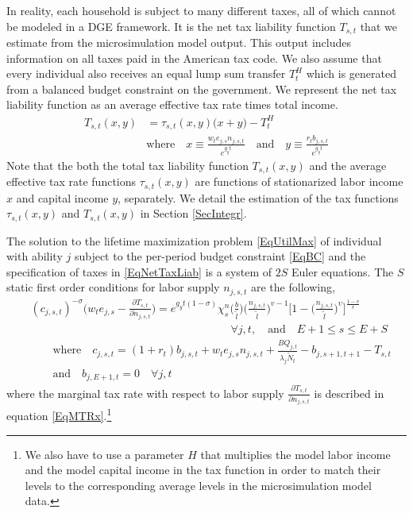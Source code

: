 \documentclass[letterpaper,12pt]{article}
\theoremstyle{definition}
\begin{document}
\begin{spacing}{1.5}
    In reality, each household is subject to many different taxes, all of which cannot be modeled in a DGE framework. It is the net tax liability function $T_{s,t}$ that we estimate from the microsimulation model output. This output includes information on all taxes paid in the American tax code. We also assume that every individual also receives an equal lump sum transfer $T^H_{t}$ which is generated from a balanced budget constraint on the government. We represent the net tax liability function as an average effective tax rate times total income.
    \begin{equation}\label{EqNetTaxLiab}
      \begin{split}
        T_{s,t}(x, y) &= \tau_{s,t}(x, y)\bigl(x + y\bigr) - T^H_t \\
        &\text{where}\quad x\equiv \frac{w_t e_{j,s}n_{j,s,t}}{e^{g_y t}} \quad\text{and}\quad y\equiv \frac{r_t b_{j,s,t}}{e^{g_y t}}
      \end{split}
    \end{equation}
    Note that the both the total tax liability function $T_{s,t}(x,y)$ and the average effective tax rate functions $\tau_{s,t}(x,y)$ are functions of stationarized labor income $x$ and capital income $y$, separately. We detail the estimation of the tax functions $\tau_{s,t}(x,y)$ and $T_{s,t}(x,y)$ in Section \ref{SecIntegr}.

    The solution to the lifetime maximization problem \eqref{EqUtilMax} of individual with ability $j$ subject to the per-period budget constraint \eqref{EqBC} and the specification of taxes in \eqref{EqNetTaxLiab} is a system of $2S$ Euler equations. The $S$ static first order conditions for labor supply $n_{j,s,t}$ are the following,
    \begin{equation}\label{EqEulerLabGen}
      \begin{split}
        &(c_{j,s,t})^{-\sigma}\Biggl(w_t e_{j,s} - \frac{\partial T_{s,t}}{\partial n_{j,s,t}}\Biggr) = e^{g_y t(1-\sigma)}\chi^n_{s}\biggl(\frac{b}{\tilde{l}}\biggr)\biggl(\frac{n_{j,s,t}}{\tilde{l}}\biggr)^{v-1}\Biggl[1 - \biggl(\frac{n_{j,s,t}}{\tilde{l}}\biggr)^\upsilon\Biggr]^{\frac{1-v}{v}} \\
        &\qquad\qquad\qquad\qquad\qquad\qquad\qquad\qquad\qquad\forall j,t, \quad\text{and}\quad E+1\leq s\leq E+S \\
        &\qquad\text{where}\quad c_{j,s,t} = \left(1 + r_t\right) b_{j,s,t} + w_t e_{j,s}n_{j,s,t} + \frac{BQ_{j,t}}{\lambda_j\tilde{N}_t} - b_{j,s+1,t+1} - T_{s,t} \\
        &\qquad\text{and}\quad b_{j,E+1,t} = 0 \quad\forall j,t
      \end{split}
    \end{equation}
    where the marginal tax rate with respect to labor supply $\frac{\partial T_{s,t}}{\partial n_{j,s,t}}$ is described in equation \ref{EqMTRx}.\footnote{We also have to use a parameter $H$ that multiplies the model labor income and the model capital income in the tax function in order to match their levels to the corresponding average levels in the microsimulation model data.}


\end{spacing}
\end{document}
